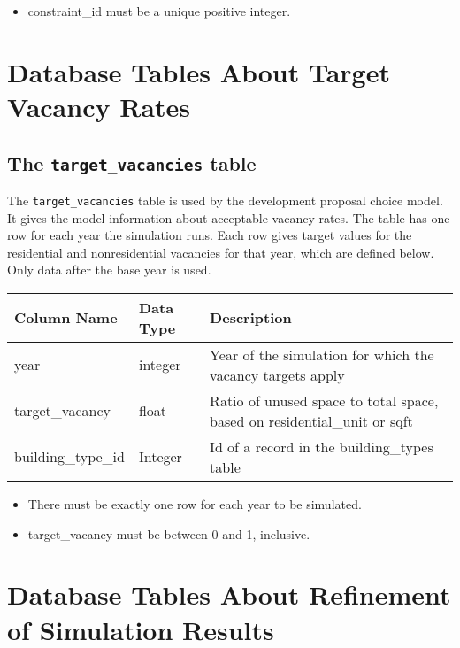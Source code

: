 \begin{itemize}
\tight
\item constraint_id must be a unique positive integer.

\end{itemize}

\section{Database Tables About Target Vacancy Rates}

\subsection{The {\tt target_vacancies} table}
\label{sec:table-target-vacancies-parcel}

The \verb|target_vacancies| table is used by the development proposal choice
model. It gives the model information about acceptable vacancy rates. The table
has one row for each year the simulation runs. Each row gives target values for
the residential and nonresidential vacancies for that year, which are defined
below.  Only data after the base year is used.

\begin{tabular}{lll}

\textbf{Column Name} & \textbf{Data Type} & \textbf{Description} \\

\hline year & integer & Year of the simulation for which the vacancy
targets
apply  \\

\hline target_vacancy & float & Ratio of unused 
space to total space, based on residential\_unit or sqft   \\

\hline building_type_id & Integer & Id of a record in the building_types table  \\

\hline
\end{tabular}

\begin{itemize}
\tight
\item There must be exactly one row for each year to be simulated.
\item target_vacancy must be between 0 and 1, inclusive.
\end{itemize}


\section{Database Tables About Refinement of Simulation Results}
